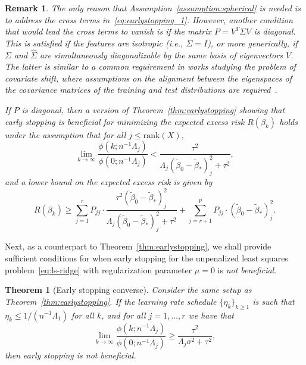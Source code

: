 \documentclass[11pt]{article}
\newtheorem{theorem}{Theorem}
\newtheorem{remark}{Remark}
\begin{document}
\begin{remark}
The only reason that Assumption~\ref{assumption:spherical} is needed is to address the cross terms in~\eqref{eq:earlystopping_1}. However, another condition that would lead the cross terms to vanish is if the matrix $P = V^T \Sigma V$ is diagonal. This is satisfied if the features are isotropic (i.e., $\Sigma = I$), or more generically, if $\Sigma$ and $\hat{\Sigma}$ are simultaneously diagonalizable by the same basis of eigenvectors $V$. The latter is similar to a common requirement in works studying the problem of covariate shift, where assumptions on the alignment between the eigenspaces of the covariance matrices of the training and test distributions are required~\cite{tripuraneni2021covariate}.  

If $P$ is diagonal, then a version of Theorem~\ref{thm:earlystopping} showing that early stopping is beneficial for minimizing the expected excess risk $R(\beta_k)$ holds under the assumption that for all $j \leq \mathrm{rank}(X)$,
\[
    \lim_{k \to \infty} \frac{\phi(k; n^{-1} \Lambda_j)}{\phi(0; n^{-1} \Lambda_j)} < \frac{\tau^2}{\Lambda_j (\tilde{\beta}_0 - \tilde{\beta}_*)_j^2 + \tau^2},
\]
and a lower bound on the expected excess risk is given by
\[
    R(\beta_k) \geq \sum_{j=1}^r P_{jj} \cdot \frac{\tau^2(\tilde{\beta}_0 - \tilde{\beta}_*)_j^2}{\Lambda_j(\tilde{\beta}_0 - \tilde{\beta}_*)_j^2 + \tau^2} + \sum_{j=r+1}^p P_{jj} \cdot (\tilde{\beta}_0 - \tilde{\beta}_*)_j^2.
\]
\end{remark}

Next, as a counterpart to Theorem~\ref{thm:earlystopping}, we shall provide sufficient conditions for when early stopping for the unpenalized least squares problem~\eqref{eq:ls-ridge} with regularization parameter $\mu = 0$ is \emph{not beneficial}.

\begin{theorem}[Early stopping converse] \label{thm:earlystoppingConverse}
Consider the same setup as Theorem~\ref{thm:earlystopping}. If the learning rate schedule $\{ \eta_k \}_{k \geq 1}$ is such that $\eta_k \le 1 / (n^{-1} \Lambda_1)$ for all $k$, and for all $j = 1, \ldots, r$ we have that 
\begin{equation} \label{eq:earlystoppingConverse_condition}
    \lim_{k \to \infty}\frac{\phi(k; n^{-1} \Lambda_j)}{\phi(0; n^{-1} \Lambda_j)} \ge \frac{\tau^2}{\Lambda_j \sigma^2 + \tau^2},
\end{equation}
then early stopping is not beneficial. 
\end{theorem}
\end{document}
